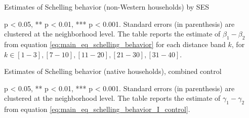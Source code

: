 \documentclass[../main.tex]{subfiles}
\begin{document}
\begin{table}[H]
    \caption{Estimates of Schelling behavior (non-Western households) by SES}
    \label{tab:main_results_ses_non_west_full}
    \begin{adjustbox}{width = 1.2\linewidth, center}    
    \begin{threeparttable}
            
    \begin{tablenotes}[flushleft]
    \item \scriptsize * p < 0.05, ** p < 0.01, *** p < 0.001. Standard errors (in parenthesis) are clustered at the neighborhood level. The table reports the estimate of $\beta_1 - \beta_2$ from equation \ref{eq:main_eq_schelling_behavior} for each distance band $k$, for $k\in {[1-3], [7-10], [11-20], [21-30], [31-40]}$. 
    \end{tablenotes}
    \end{threeparttable}
    \end{adjustbox}
\end{table}

\begin{table}[H]
    \centering
    \caption{Estimates of Schelling behavior (native households), combined control}
    \label{tab:main_results_robust_I_control_full}
    \begin{threeparttable}
            
    \begin{tablenotes}[flushleft]
    \item \scriptsize * p < 0.05, ** p < 0.01, *** p < 0.001. Standard errors (in parenthesis) are clustered at the neighborhood level. The table reports the estimate of $\gamma_1 - \gamma_2$ from equation \ref{eq:main_eq_schelling_behavior_I_control}. 
    \end{tablenotes}
    \end{threeparttable}
\end{table}
\end{document}
